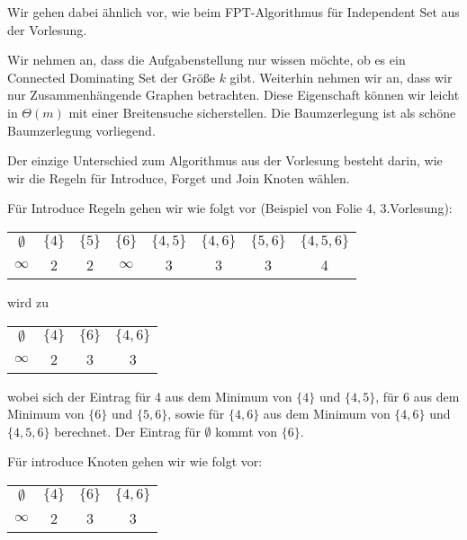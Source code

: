 

\DeclareMathOperator{\vc}{vc}






Wir gehen dabei ähnlich vor, wie beim FPT-Algorithmus für Independent Set aus der Vorlesung.

Wir nehmen an, dass die Aufgabenstellung nur wissen möchte, ob es ein Connected Dominating Set der Größe $k$ gibt. Weiterhin nehmen wir an, dass wir nur Zusammenhängende Graphen betrachten.
Diese Eigenschaft können wir leicht in $\Theta(m)$ mit einer Breitensuche sicherstellen.
Die Baumzerlegung ist als schöne Baumzerlegung vorliegend.

Der einzige Unterschied zum Algorithmus aus der Vorlesung besteht darin, wie wir die Regeln für Introduce, Forget und Join Knoten wählen.

Für Introduce Regeln gehen wir wie folgt vor (Beispiel von Folie 4, 3.Vorlesung):

\begin{center}
\begin{tabular}{c c c c c c c c}
    $\emptyset$ & $\{4\}$ & $\{5\}$ & $\{6\}$ & $\{4,5\}$ &$\{4,6\}$ &$\{5,6\}$ &$\{4,5,6\}$\\
    $\infty$ & 2 & 2 & $\infty$ & 3 & 3 & 3 & 4\\
\end{tabular}
\end{center}

wird zu

\begin{center}
\begin{tabular}{c c c c}
    $\emptyset$ & $\{4\}$ & $\{6\}$ & $\{4,6\}$\\
    $\infty$ & 2 & 3 & 3\\
\end{tabular}
\end{center}

wobei sich der Eintrag für 4 aus dem Minimum von $\{4\}$ und $\{4,5\}$,
für 6 aus dem Minimum von $\{6\}$ und $\{5,6\}$, sowie für $\{4,6\}$ aus dem Minimum von $\{4,6\}$ und $\{4,5,6\}$ berechnet.
Der Eintrag für $\emptyset$ kommt von $\{6\}$.

Für introduce Knoten gehen wir wie folgt vor:

\begin{center}
\begin{tabular}{c c c c}
    $\emptyset$ & $\{4\}$ & $\{6\}$ & $\{4,6\}$\\
    $\infty$ & 2 & 3 & 3\\
\end{tabular}
\end{center}

